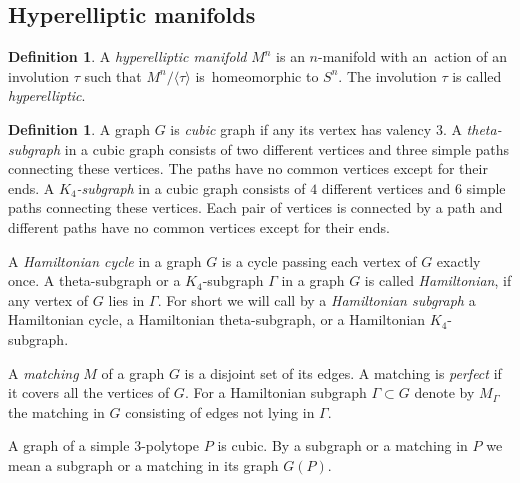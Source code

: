 \documentclass[12pt]{amsart}
\theoremstyle{definition}
\newtheorem{definition}[formula]{Definition}
\theoremstyle{remark}
\begin{document}
\subsection{Hyperelliptic manifolds}
\begin{definition}\label{def:hypm}
A {\it hyperelliptic manifold} $M^n$ is an $n$-manifold with an~action of an involution $\tau$ such that $M^n/\langle\tau\rangle$ 
is~homeomorphic to $S^n$. The involution $\tau$ is called {\it hyperelliptic}.  
\end{definition}

\begin{definition}
A graph $G$ is {\it cubic} graph if any its vertex has valency $3$. A {\it theta-subgraph} in a cubic graph
consists of two different vertices and three simple paths connecting these vertices. The paths have no common vertices except for their ends. A {\it $K_4$-subgraph} in a cubic graph consists of $4$ different 
vertices and $6$ simple paths connecting these vertices.
Each pair of vertices is connected by a path and different paths have no common vertices except for their ends.  

A {\it Hamiltonian cycle} in a graph $G$ is a cycle passing each vertex of $G$ exactly once.
A theta-subgraph or a $K_4$-subgraph $\Gamma$ in a graph $G$ is called {\it Hamiltonian}, if
any vertex of $G$ lies in $\Gamma$. 
For short we will call by a {\it Hamiltonian subgraph} a Hamiltonian cycle, a Hamiltonian theta-subgraph,
or a Hamiltonian $K_4$-subgraph.  

A {\it matching} $M$ of a graph $G$ is a disjoint set of its edges. A matching is {\it perfect} if it covers all the vertices of $G$. 
For a Hamiltonian subgraph $\Gamma\subset G$ denote by $M_\Gamma$ the matching in $G$
consisting of edges not lying in $\Gamma$.

A graph of a simple $3$-polytope $P$
is cubic.  By a subgraph or a matching in $P$ we mean a subgraph or a matching in its graph $G(P)$.

\end{definition}
\end{document}
